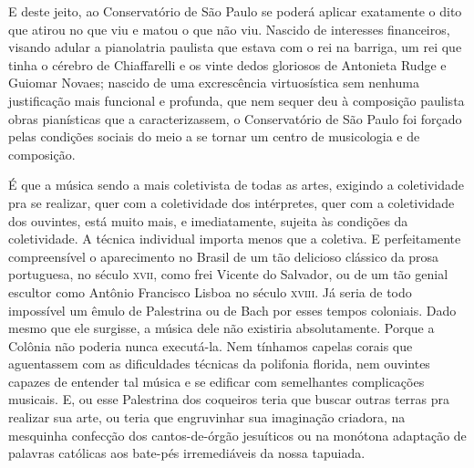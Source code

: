 E deste jeito, ao Conservatório de São Paulo se poderá aplicar
exatamente o dito que atirou no que viu e matou o que não viu. Nascido
de interesses financeiros, visando adular a pianolatria paulista que
estava com o rei na barriga, um rei que tinha o cérebro de Chiaffarelli
e os vinte dedos gloriosos de Antonieta Rudge e Guiomar Novaes; nascido
de uma excrescência virtuosística sem nenhuma justificação mais
funcional e profunda, que nem sequer deu à composição paulista obras
pianísticas que a caracterizassem, o Conservatório de São Paulo foi
forçado pelas condições sociais do meio a se tornar um centro de
musicologia e de composição.

É que a música sendo a mais coletivista de todas as artes, exigindo a
coletividade pra se realizar, quer com a coletividade dos intérpretes,
quer com a coletividade dos ouvintes, está muito mais, e imediatamente,
sujeita às condições da coletividade. A técnica individual importa menos
que a coletiva. E perfeitamente compreensível o aparecimento no Brasil
de um tão delicioso clássico da prosa portuguesa, no século \textsc{xvii}, como
frei Vicente do Salvador, ou de um tão genial escultor como Antônio
Francisco Lisboa no século \textsc{xviii}. Já seria de todo impossível um êmulo
de Palestrina ou de Bach por esses tempos coloniais. Dado mesmo que ele
surgisse, a música dele não existiria absolutamente. Porque a Colônia
não poderia nunca executá-la. Nem tínhamos capelas corais que
aguentassem com as dificuldades técnicas da polifonia florida, nem
ouvintes capazes de entender tal música e se edificar com semelhantes
complicações musicais. E, ou esse Palestrina dos coqueiros teria que
buscar outras terras pra realizar sua arte, ou teria que engruvinhar sua
imaginação criadora, na mesquinha confecção dos cantos-de-órgão
jesuíticos ou na monótona adaptação de palavras católicas aos bate-pés
irremediáveis da nossa tapuiada.

